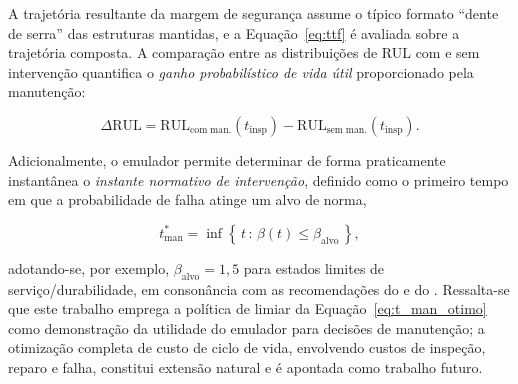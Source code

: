 A trajetória resultante da margem de segurança assume o típico formato ``dente de serra'' das estruturas mantidas, e a Equação~\eqref{eq:ttf} é avaliada sobre a trajetória composta. A comparação entre as distribuições de RUL com e sem intervenção quantifica o \textit{ganho probabilístico de vida útil} proporcionado pela manutenção:

\begin{equation}
\Delta \mathrm{RUL} = \mathrm{RUL}_{\mathrm{com\;man.}}(t_{\mathrm{insp}}) - \mathrm{RUL}_{\mathrm{sem\;man.}}(t_{\mathrm{insp}}).
\label{eq:delta_rul}
\end{equation}

Adicionalmente, o emulador permite determinar de forma praticamente instantânea o \textit{instante normativo de intervenção}, definido como o primeiro tempo em que a probabilidade de falha atinge um alvo de norma,

\begin{equation}
t_{\mathrm{man}}^{*} = \inf\left\{\, t \,:\, \beta(t) \leq \beta_{\mathrm{alvo}} \,\right\},
\label{eq:t_man_otimo}
\end{equation}

\noindent adotando-se, por exemplo, $\beta_{\mathrm{alvo}} = 1{,}5$ para estados limites de serviço/durabilidade, em consonância com as recomendações do \citet{fib2006} e do \citet{jcss2001}. Ressalta-se que este trabalho emprega a política de limiar da Equação~\eqref{eq:t_man_otimo} como demonstração da utilidade do emulador para decisões de manutenção; a otimização completa de custo de ciclo de vida, envolvendo custos de inspeção, reparo e falha, constitui extensão natural e é apontada como trabalho futuro.

